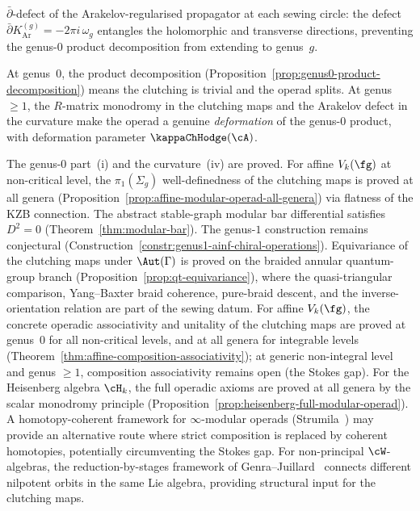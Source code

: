 \begin{definition}
\begin{enumerate}[label=\textup{(\roman*)}]
 $\bar\partial$-defect of the Arakelov-regularised
 propagator at each sewing circle: the defect
 $\bar\partial K_{\mathrm{Ar}}^{(g)} =
 -2\pi i\,\omega_g$ entangles the holomorphic and
 transverse directions, preventing the genus-$0$ product
 decomposition from extending to genus~$g$.
\end{enumerate}
At genus~$0$, the product decomposition
(Proposition~\textup{\ref{prop:genus0-product-decomposition}})
means the clutching is trivial and the operad splits.
At genus $\ge 1$, the $R$-matrix monodromy in the
clutching maps and the Arakelov defect in the curvature
make the operad a genuine \emph{deformation} of the
genus-$0$ product, with deformation parameter
$\kappaChHodge(\cA)$.
\end{definition}

\begin{remark}
\label{rem:modular-operad-proved-loci}
The genus-$0$ part~(i) and the curvature~(iv)
are proved. For affine $V_k(\fg)$ at non-critical level,
the $\pi_1(\Sigma_g)$ well-definedness of the
clutching maps is proved at all genera
(Proposition~\textup{\ref{prop:affine-modular-operad-all-genera}})
via flatness of the KZB connection. The abstract
stable-graph modular bar differential satisfies
$D^2=0$ (Theorem~\textup{\ref{thm:modular-bar}}).
The genus-$1$ construction remains conjectural
(Construction~\textup{\ref{constr:genus1-ainf-chiral-operations}}).
Equivariance of the clutching maps under $\Aut(\Gamma)$
is proved on the braided annular quantum-group branch
(Proposition~\textup{\ref{prop:qt-equivariance}}), where the
quasi-triangular comparison, Yang--Baxter braid coherence,
pure-braid descent, and the inverse-orientation relation are
part of the sewing datum.
For affine $V_k(\fg)$, the concrete operadic
associativity and unitality of the
clutching maps are proved at genus~$0$ for all
non-critical levels, and at all genera for integrable
levels
(Theorem~\textup{\ref{thm:affine-composition-associativity}});
at generic non-integral level and genus $\ge 1$,
composition associativity remains open
(the Stokes gap).
For the Heisenberg algebra $\cH_k$, the full operadic
axioms are proved at all genera by the scalar monodromy
principle
(Proposition~\ref{prop:heisenberg-full-modular-operad}).
A homotopy-coherent framework for $\infty$-modular operads
(Strumila~\cite{Strumila25}) may provide an alternative
route where strict composition is replaced by coherent
homotopies, potentially circumventing the Stokes gap.
For non-principal $\cW$-algebras, the reduction-by-stages
framework of Genra--Juillard~\cite{GenraJuillard25}
connects different nilpotent orbits in the same Lie algebra,
providing structural input for the clutching maps.
\end{remark}

